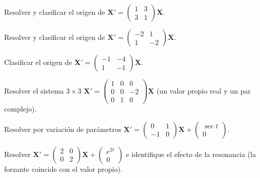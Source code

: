 \begin{prob}
Resolver y clasificar el origen de $\mathbf{X}'=\begin{pmatrix}1&3\\3&1\end{pmatrix}\mathbf{X}$.
\end{prob}

\begin{prob}
Resolver y clasificar el origen de $\mathbf{X}'=\begin{pmatrix}-2&1\\1&-2\end{pmatrix}\mathbf{X}$.
\end{prob}

\begin{prob}
Clasificar el origen de $\mathbf{X}'=\begin{pmatrix}-1&-4\\1&-1\end{pmatrix}\mathbf{X}$.
\end{prob}

\begin{prob}
Resolver el sistema $3\times 3$ $\mathbf{X}'=\begin{pmatrix}1&0&0\\0&0&-2\\0&1&0\end{pmatrix}\mathbf{X}$ (un valor propio real y un par complejo).
\end{prob}

\begin{prob}
Resolver por variación de parámetros $\mathbf{X}'=\begin{pmatrix}0&1\\-1&0\end{pmatrix}\mathbf{X}+\begin{pmatrix}\sec t\\0\end{pmatrix}$.
\end{prob}

\begin{prob}
Resolver $\mathbf{X}'=\begin{pmatrix}2&0\\0&2\end{pmatrix}\mathbf{X}+\begin{pmatrix}e^{2t}\\0\end{pmatrix}$ e identifique el efecto de la resonancia (la forzante coincide con el valor propio).
\end{prob}
